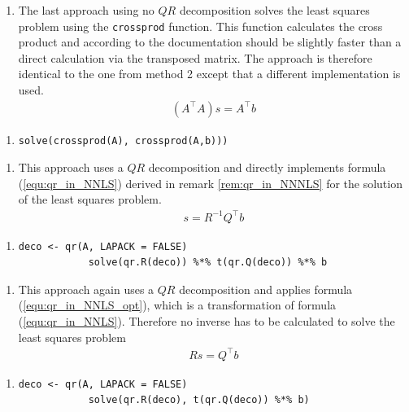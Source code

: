 \begin{enumerate}[resume*=quest]
	\item The last approach using no $QR$ decomposition solves the least squares problem using the \texttt{crossprod} function. This function calculates the cross product and according to the documentation should be slightly faster than a direct calculation via the transposed matrix. The approach is therefore identical to the one from method 2 except that a different implementation is used.
	\begin{align*}
		(A^\top A)s =  A^\top b
	\end{align*}
\end{enumerate}
\begin{enumerate}[resume*=inform]
	\item[] \begin{lstlisting}[otherkeywords={\%*\%, qr.R}, numbers=none]
	solve(crossprod(A), crossprod(A,b)))
	\end{lstlisting}
\end{enumerate}


\begin{enumerate}[resume*=quest]
	\item This approach uses a $QR$ decomposition and directly implements formula (\ref{equ:qr_in_NNLS}) derived in remark \ref{rem:qr_in_NNNLS} for the solution of the least squares problem. 
	\begin{align*}
		s = R^{-1} Q^\top b
	\end{align*}
\end{enumerate}
\begin{enumerate}[resume*=inform]
	\item[] \begin{lstlisting}[otherkeywords={\%*\%, qr.R}, numbers=none]
			deco <- qr(A, LAPACK = FALSE)
			solve(qr.R(deco)) %*% t(qr.Q(deco)) %*% b
			\end{lstlisting}
\end{enumerate}


\begin{enumerate}[resume*=quest]
	\item This approach again uses a $QR$ decomposition and applies formula (\ref{equ:qr_in_NNLS_opt}), which is a transformation of formula (\ref{equ:qr_in_NNLS}). Therefore no inverse has to be calculated to solve the least squares problem
	\begin{align*}
		Rs = Q^\top b
	\end{align*}
\end{enumerate}
\begin{enumerate}[resume*=inform]
	\item[] \begin{lstlisting}[otherkeywords={\%*\%, qr.R}, numbers=none]
			deco <- qr(A, LAPACK = FALSE)
			solve(qr.R(deco), t(qr.Q(deco)) %*% b)
			\end{lstlisting}
\end{enumerate}


